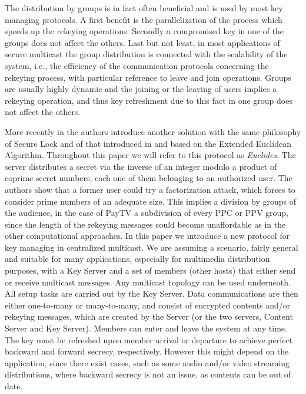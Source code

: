 \documentclass[a4paper,11pt]{amsart}
\theoremstyle{definition}
\begin{document}
The distribution by groups is in fact often beneficial and is used by
most key managing protocols. A first benefit is the parallelization of
the process which speeds up the rekeying operations. Secondly a
compromised key in one of the groups does not affect the others.  Last
but not least, in most applications of secure multicast the group distribution is
connected with the scalability of the system, i.e., the efficiency of
the communication protocols concerning the rekeying process, with
particular reference to leave and join operations. Groups are usually
highly dynamic and the joining or the leaving of users implies a
rekeying operation, and thus key refreshment due to this fact in one
group does not affect the others.

More recently in \cite{euclid} the authors introduce another solution
with the same philosophy of Secure Lock and of that introduced in
\cite{cas} and based on the Extended Euclidean Algorithm. Throughout
this paper we will refer to this protocol as {\it Euclides}. The
server distributes a secret via the inverse of an integer modulo a
product of coprime secret numbers, each one of them belonging to an
authorized user. The authors show \cite{euclid} that a former user
could try a factorization attack, which forces to consider prime
numbers of an adequate size. This implies a division by groups of the
audience, in the case of PayTV a subdivision of every PPC or PPV
group, since the length of the rekeying messages could become
unaffordable as in the other computational
approaches. 
In this paper we introduce a new protocol for key managing in
centralized multicast. We are assuming a scenario, fairly general and
suitable for many applications, especially for multimedia distribution
purposes, with a Key Server and a set of members (other hosts) that
either send or receive multicast messages. Any multicast topology can
be used underneath. All setup tasks are carried out by the Key Server.
Data communications are then either one-to-many or many-to-many, and
consist of encrypted contents and/or rekeying messages, which are
created by the Server (or the two servers, Content Server and Key
Server).  Members can enter and leave the system at any time. The key
must be refreshed upon member arrival or departure to achieve perfect
backward and forward secrecy, respectively. However this might depend
on the application, since there exist cases, such as some audio and/or
video streaming distributions, where backward secrecy is not an issue,
as contents can be out of date.
\end{document}
